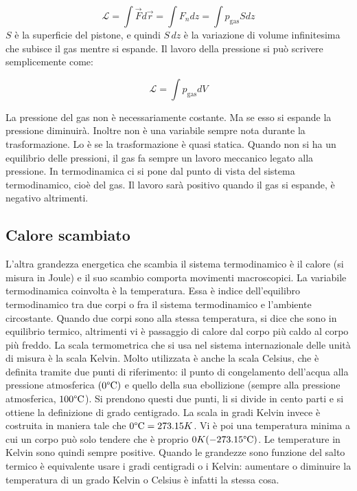 \[
	\mathcal{L} = \int \vec{F} d\vec{r} = \int F_n dz = \int p_{\text{gas} }Sdz
\]
$S$ è la superficie del pistone, e quindi $S\,dz$ è la variazione di volume infinitesima che subisce il gas mentre si espande. Il lavoro della pressione si può scrivere semplicemente come:

\[
	\boxed{\mathcal{L} = \int p_{\text{gas}}dV}
\]

La pressione del gas non è necessariamente costante. Ma se esso si espande la pressione diminuirà. Inoltre non è una variabile sempre nota durante la trasformazione. Lo è se la trasformazione è quasi statica. Quando non si ha un equilibrio delle pressioni, il gas fa sempre un lavoro meccanico legato alla pressione. In termodinamica ci si pone dal punto di vista del sistema termodinamico, cioè del gas. Il lavoro sarà positivo quando il gas si espande, è negativo altrimenti.

\subsection{Calore scambiato}

L'altra grandezza energetica che scambia il sistema termodinamico è il calore (si misura in Joule) e il suo scambio comporta movimenti macroscopici. La variabile termodinamica coinvolta è la temperatura. Essa è indice dell'equilibro termodinamico tra due corpi o fra il sistema termodinamico e l'ambiente circostante. Quando due corpi sono alla stessa temperatura, si dice che sono in equilibrio termico, altrimenti vi è passaggio di calore dal corpo più caldo al corpo più freddo. La scala termometrica che si usa nel sistema internazionale delle unità di misura è la scala Kelvin. Molto utilizzata è anche la scala Celsius, che è definita tramite due punti di riferimento: il punto di congelamento dell'acqua alla pressione atmosferica $(0 \degree \text{C})$ e quello della sua ebollizione (sempre alla pressione atmosferica, $100 \degree \text{C}$). Si prendono questi due punti, li si divide in cento parti e si ottiene la definizione di grado centigrado. La scala in gradi Kelvin invece è costruita in maniera tale che $0 \degree \text{C} =273.15 K$. Vi è poi una temperatura minima a cui un corpo può solo tendere che è proprio $0 K (-273.15 \degree \text{C})$. Le temperature in Kelvin sono quindi sempre positive. Quando le grandezze sono funzione del salto termico è equivalente usare i gradi centigradi o i Kelvin: aumentare o diminuire la temperatura di un grado Kelvin o Celsius è infatti la stessa cosa.

